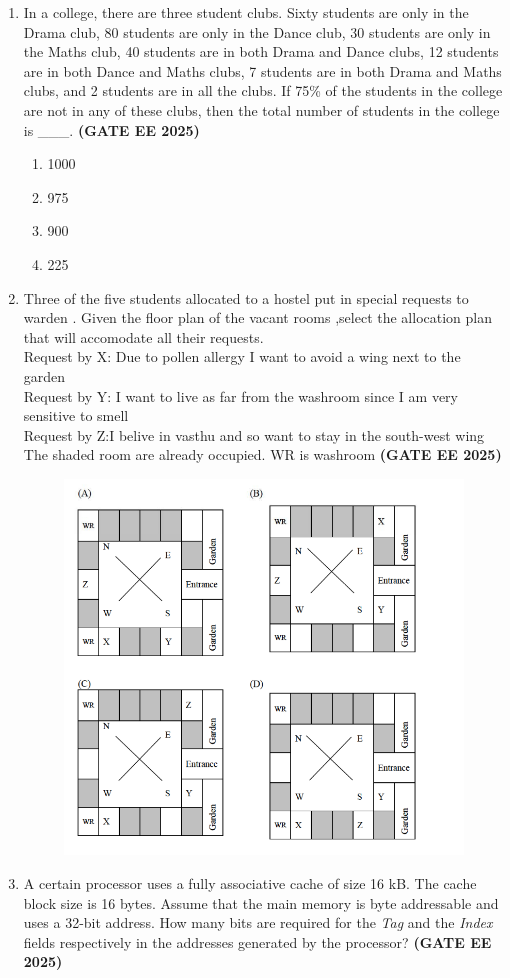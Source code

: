 \documentclass[journal,12pt,onecolumn]{IEEEtran}
\theoremstyle{remark}
\begin{document}
\begin{enumerate}
\item In a college, there are three student clubs. Sixty students are only in the Drama club, 80 students are only in the Dance club, 30 students are only in the Maths club, 40 students are in both Drama and Dance clubs, 12 students are in both Dance and Maths clubs, 7 students are in both Drama and Maths clubs, and 2 students are in all the clubs. If 75\% of the students in the college are not in any of these clubs, then the total number of students in the college is \_\_\_. \hfill \textbf{(GATE EE 2025)}
\begin{enumerate}
    \item 1000
    \item 975
    \item 900
    \item 225
\end{enumerate}
\item Three of the five students allocated to a hostel put in special requests to warden . Given the floor plan of the vacant rooms ,select the allocation plan that will accomodate all their requests.\\
Request by X: Due to pollen allergy I want to avoid a wing next to the garden \\
Request by Y: I want to live as far from the washroom since I am very sensitive to smell\\
Request by Z:I belive in vasthu and so want to stay in the south-west wing \\
The shaded room are already occupied. WR is washroom \hfill \textbf{(GATE EE 2025)}
\begin{figure}[H]
    \centering
    \includegraphics[width=0.5\linewidth]{figs/fig2.png}
    \caption{ }
    \label{fig2}
\end{figure}

\item A certain processor uses a fully associative cache of size 16 kB. The cache block size is 16 bytes. Assume that the main memory is byte addressable and uses a 32-bit address. How many bits are required for the \textit{Tag} and the \textit{Index} fields respectively in the addresses generated by the processor? \hfill \textbf{(GATE EE 2025)}


\end{enumerate}
\end{document}
